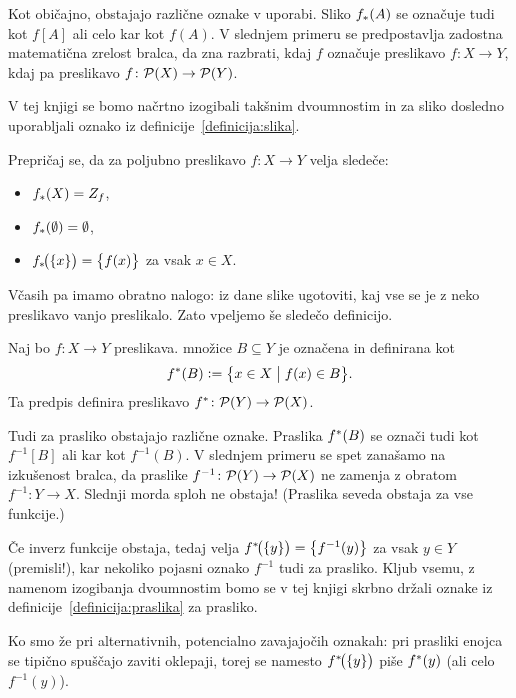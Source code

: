 \begin{opomba}
Kot običajno, obstajajo različne oznake v uporabi. Sliko $\img{f}{A}$ se označuje tudi kot $f[A]$ ali celo kar kot $f(A)$. V slednjem primeru se predpostavlja zadostna matematična zrelost bralca, da zna razbrati, kdaj $f$ označuje preslikavo $f\colon X \to Y$, kdaj pa preslikavo $f\colon \mathcal{P}(X) \to \mathcal{P}(Y)$.

V tej knjigi se bomo načrtno izogibali takšnim dvoumnostim in za sliko dosledno uporabljali oznako iz definicije~\ref{definicija:slika}.
\end{opomba}

\begin{vaja}
Prepričaj se, da za poljubno preslikavo $f\colon X \to Y$ velja sledeče:
\begin{itemize}
\item
$\img{f}{X} = \rn{f}$,
\item
$\img{f}{\emptyset} = \emptyset$,
\item
$\img[1]{f}{\set{x}} = \set[1]{f(x)}$ za vsak $x \in X$.
\end{itemize}
\end{vaja}


Včasih pa imamo obratno nalogo: iz dane slike ugotoviti, kaj vse se je z neko preslikavo vanjo preslikalo. Zato vpeljemo še sledečo definicijo.

\begin{definicija}\label{definicija:praslika}
Naj bo $f\colon X \to Y$ preslikava.  množice $B \subseteq Y$ je označena in definirana kot
\[\pim{f}{B} \dfeq \set[1]{x \in X}{f(x) \in B}.\]
Ta predpis definira preslikavo $\pim{f}\colon \pst(Y) \to \pst(X)$.
\end{definicija}

\begin{opomba}
Tudi za prasliko obstajajo različne oznake. Praslika $\pim{f}{B}$ se označi tudi kot $f^{-1}[B]$ ali kar kot $f^{-1}(B)$. V slednjem primeru se spet zanašamo na izkušenost bralca, da praslike $f^{-1}\colon \mathcal{P}(Y) \to \mathcal{P}(X)$ ne zamenja z obratom $f^{-1}\colon Y \to X$. Slednji morda sploh ne obstaja! (Praslika seveda obstaja za vse funkcije.)

Če inverz funkcije obstaja, tedaj velja $\pim[1]{f}{\set{y}} = \set[1]{f^{-1}(y)}$ za vsak $y \in Y$ (premisli!), kar nekoliko pojasni oznako $f^{-1}$ tudi za prasliko. Kljub vsemu, z namenom izogibanja dvoumnostim bomo se v tej knjigi skrbno držali oznake iz definicije~\ref{definicija:praslika} za prasliko.

Ko smo že pri alternativnih, potencialno zavajajočih oznakah: pri prasliki enojca se tipično spuščajo zaviti oklepaji, torej se namesto $\pim[1]{f}{\set{y}}$ piše $\pim{f}{y}$ (ali celo $f^{-1}(y)$).
\end{opomba}

